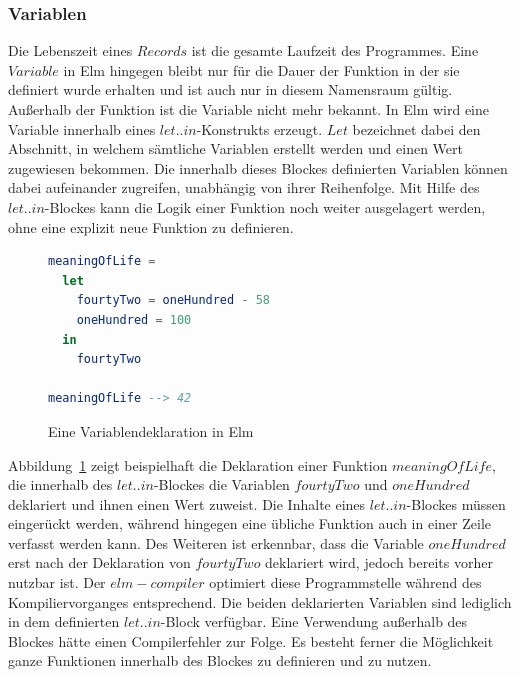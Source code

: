 \subsubsection{Variablen}
\label{sec:Variablen}
Die Lebenszeit eines $Records$ ist die gesamte Laufzeit des Programmes. Eine $Variable$ in Elm hingegen bleibt nur für die Dauer der Funktion in der sie definiert wurde erhalten und ist auch nur in diesem Namensraum gültig. Außerhalb der Funktion ist die Variable nicht mehr bekannt. In Elm wird eine Variable innerhalb eines $let..in$-Konstrukts erzeugt. $Let$ bezeichnet dabei den Abschnitt, in welchem sämtliche Variablen erstellt werden und einen Wert zugewiesen bekommen. Die innerhalb dieses Blockes definierten Variablen können dabei aufeinander zugreifen, unabhängig von ihrer Reihenfolge. Mit Hilfe des $let..in$-Blockes kann die Logik einer Funktion noch weiter ausgelagert werden, ohne eine explizit neue Funktion zu definieren.
\begin{figure}[h]
\begin{lstlisting}[language=Elm]
meaningOfLife =
  let
    fourtyTwo = oneHundred - 58
    oneHundred = 100
  in
    fourtyTwo

meaningOfLife --> 42
\end{lstlisting}
\caption{Eine Variablendeklaration in Elm}\label{fig:elm-variables}
\end{figure}
Abbildung~\ref{fig:elm-variables} zeigt beispielhaft die Deklaration einer Funktion $meaningOfLife$, die innerhalb des $let..in$-Blockes die Variablen $fourtyTwo$ und $oneHundred$ deklariert und ihnen einen Wert zuweist. Die Inhalte eines $let..in$-Blockes müssen eingerückt werden, während hingegen eine übliche Funktion auch in einer Zeile verfasst werden kann. Des Weiteren ist erkennbar, dass die Variable $oneHundred$ erst nach der Deklaration von $fourtyTwo$ deklariert wird, jedoch bereits vorher nutzbar ist. Der $elm-compiler$ optimiert diese Programmstelle während des Kompiliervorganges entsprechend. Die beiden deklarierten Variablen sind lediglich in dem definierten $let..in$-Block verfügbar. Eine Verwendung außerhalb des Blockes hätte einen Compilerfehler zur Folge. Es besteht ferner die Möglichkeit ganze Funktionen innerhalb des Blockes zu definieren und zu nutzen.


